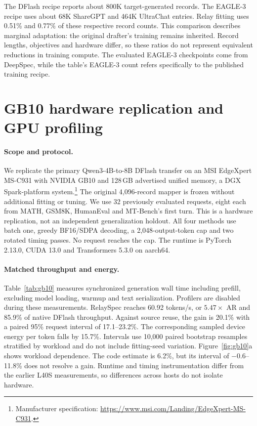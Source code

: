 \documentclass{article}
\begin{document}
The DFlash recipe reports about 800K target-generated records. The
EAGLE-3 recipe uses about 68K ShareGPT and 464K UltraChat entries.
Relay fitting uses 0.51\% and 0.77\% of these respective record counts.
This comparison describes marginal adaptation: the original drafter's
training remains inherited. Record lengths, objectives and hardware differ,
so these ratios do not represent equivalent reductions in training compute.
The evaluated EAGLE-3 checkpoints come from DeepSpec, while the table's
EAGLE-3 count refers specifically to the published training recipe.


\clearpage
\section{GB10 hardware replication and GPU profiling}
\label{app:gb10}

\paragraph{Scope and protocol.}
We replicate the primary Qwen3-4B-to-8B DFlash transfer on an MSI
EdgeXpert MS-C931 with NVIDIA GB10 and 128\,GB advertised unified memory,
a DGX Spark-platform system.\footnote{Manufacturer specification:
\url{https://www.msi.com/Landing/EdgeXpert-MS-C931}.}
The original 4,096-record mapper is frozen without additional fitting or
tuning. We use 32 previously evaluated requests, eight each from MATH,
GSM8K, HumanEval and MT-Bench's first turn. This is a hardware replication,
not an independent generalization holdout. All four methods use batch one,
greedy BF16/SDPA decoding, a 2,048-output-token cap and two rotated timing
passes. No request reaches the cap. The runtime is PyTorch 2.13.0,
CUDA 13.0 and Transformers 5.3.0 on aarch64.

\paragraph{Matched throughput and energy.}
Table~\ref{tab:gb10} measures synchronized generation wall time including
prefill, excluding model loading, warmup and text serialization.
Profilers are disabled during these measurements. RelaySpec reaches
60.92 tokens/s, or $5.47\times$ AR and 85.9\% of native DFlash throughput.
Against source reuse, the gain is 20.1\% with a paired 95\% request
interval of 17.1--23.2\%. The corresponding sampled device energy per
token falls by 15.7\%. Intervals use 10,000 paired bootstrap resamples
stratified by workload and do not include fitting-seed variation.
Figure~\ref{fig:gb10}a shows workload dependence. The code estimate is
6.2\%, but its interval of $-0.6$--11.8\% does not resolve a gain.
Runtime and timing instrumentation differ from the earlier
L40S measurements, so differences across hosts do not isolate hardware.
\end{document}
